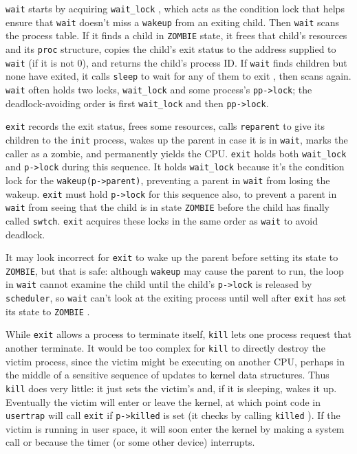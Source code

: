 \lstinline{wait} starts by acquiring
\lstinline{wait_lock}
,
which acts as the condition
lock that helps ensure that \lstinline{wait} doesn't miss a \lstinline{wakeup}
from an exiting child.
Then \lstinline{wait} scans the process table.
If it finds a child in \texttt{ZOMBIE} state,
it frees that child's resources and
its \lstinline{proc} structure, copies
the child's exit status to the address supplied to \lstinline{wait}
(if it is not 0),
and returns the child's process ID.
If 
\lstinline{wait}
finds children but none have exited,
it calls
\lstinline{sleep}
to wait for any of them to exit
,
then scans again.
\lstinline{wait} often holds two locks,
\lstinline{wait_lock} and some process's \lstinline{pp->lock};
the deadlock-avoiding order is first \lstinline{wait_lock}
and then \lstinline{pp->lock}.

\lstinline{exit}  records the exit
status, frees some resources, calls \lstinline{reparent} to give its
children to the \lstinline{init} process, wakes up the parent in case
it is in \lstinline{wait}, marks the caller as a zombie, and
permanently yields the CPU. \lstinline{exit} holds both
\lstinline{wait_lock} and \lstinline{p->lock} during this
sequence.
It holds \lstinline{wait_lock} because 
it's the condition
lock for the \lstinline{wakeup(p->parent)}, preventing a parent in
\lstinline{wait} from losing the wakeup. \lstinline{exit} must hold
\lstinline{p->lock} for this sequence also, to prevent a parent in
\lstinline{wait} from seeing that the child is in state
\lstinline{ZOMBIE} before the child has finally called
\lstinline{swtch}. \lstinline{exit} acquires these locks in
the same order as \lstinline{wait} to avoid deadlock.

It may look incorrect for \lstinline{exit} to wake up the parent
before setting its state to \lstinline{ZOMBIE}, 
but that is safe:
although
\lstinline{wakeup}
may cause the parent to run,
the loop in
\lstinline{wait}
cannot examine the child until the child's
\lstinline{p->lock}
is released by {\tt scheduler},
so
\lstinline{wait}
can't look at
the exiting process until well after
\lstinline{exit}
has set its state to
\lstinline{ZOMBIE}
.

While
\lstinline{exit} 
allows a process to terminate itself,
\lstinline{kill}
lets one process request that another terminate.
It would be too complex for
\lstinline{kill}
to directly destroy the victim process, since the victim
might be executing on another CPU, perhaps
in the middle of a sensitive sequence of updates to kernel data structures.
Thus
\lstinline{kill}
does very little: it just sets the victim's
and, if it is sleeping, wakes it up.
Eventually the victim will enter or leave the kernel,
at which point code in
\lstinline{usertrap}
will call
\lstinline{exit}
if
\lstinline{p->killed}
is set
(it checks by calling
\lstinline{killed}
).
If the victim is running in user space, it will soon enter
the kernel by making a system call or because the timer (or
some other device) interrupts.

